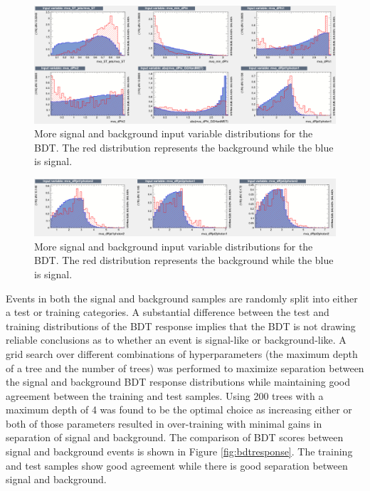 \begin{figure}[h]
	\centering
	\includegraphics[width=1.7\linewidth, height=0.5\textheight, angle=90]{Figures/BDTvar2}
	\caption[BDT input variables 2]{More signal and background input variable distributions for the BDT.  The red distribution represents the background while the blue is signal.}
	\label{fig:bdtvar2}
\end{figure}

\begin{figure}[h]
	\centering
	\includegraphics[width=1.7\linewidth, height=0.3\textheight, angle=90]{Figures/BDTvar3}
	\caption[BDT input variables 3]{More signal and background input variable distributions for the BDT.  The red distribution represents the background while the blue is signal.}
	\label{fig:bdtvar3}
\end{figure}

Events in both the signal and background samples are randomly split into either a test or training categories.  A substantial difference between the test and training distributions of the BDT response implies that the BDT is not drawing reliable conclusions as to whether an event is signal-like or background-like.  A grid search over different combinations of hyperparameters (the maximum depth of a tree and the number of trees) was performed to maximize separation between the signal and background BDT response distributions while maintaining good agreement between the training and test samples.  Using 200 trees with a maximum depth of 4 was found to be the optimal choice as increasing either or both of those parameters resulted in over-training with minimal gains in separation of signal and background. The comparison of BDT scores between signal and background events is shown in Figure \ref{fig:bdtresponse}.  The training and test samples show good agreement while there is good separation between signal and background.

